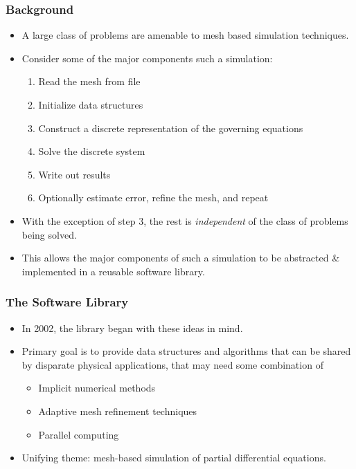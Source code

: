  

\frame
{
  \frametitle{Background}                 
  \begin{itemize}
    \item A large class of problems are amenable to \textcolor{nasablue}{mesh based} simulation techniques.
    \item Consider some of the major components such a simulation:
      \pause
      \begin{enumerate}
        \item Read the mesh from file
        \item Initialize data structures
        \item Construct a discrete representation of the governing equations
        \item Solve the discrete system
        \item Write out results
        \item Optionally estimate error, refine the mesh, and repeat
      \end{enumerate}

    \pause
    \item With the exception of step 3, the rest is \emph{independent} of the class of problems being solved.
    \pause
    \item This allows the major components of such a simulation to be abstracted \& implemented in a reusable software library.
  \end{itemize}
}


 

\frame
{
  \frametitle{The \libmesh{} Software Library}
  \begin{itemize}
    \item In 2002, the \libmesh{} library began with these ideas in mind.
    \item Primary goal is to provide data structures and algorithms that can be shared by disparate physical applications, that may need some combination of
      \begin{itemize}
      \item Implicit numerical methods
      \item Adaptive mesh refinement techniques
      \item Parallel computing
      \end{itemize}
    \item Unifying theme: \textcolor{nasablue}{mesh-based simulation of partial differential equations}.
  \end{itemize}
}



